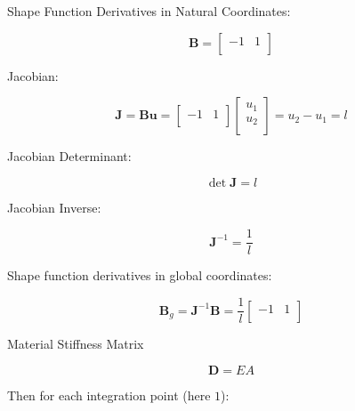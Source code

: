 \documentclass[10pt,b5paper,titlepage]{book}
\newcommand{\m}{\mathbf}
\begin{document}
Shape Function Derivatives in Natural Coordinates:

\begin{equation}
    \m{B} = \begin{bmatrix}
        -1 & 1 \\
    \end{bmatrix}
\end{equation}

Jacobian:

\begin{equation}
    \m{J} = \m{B} \m{u} = \begin{bmatrix}
        -1 & 1 \\
    \end{bmatrix}
    \begin{bmatrix}
        u_1 \\
        u_2 \\
    \end{bmatrix}
    = u_2 - u_1 = l
\end{equation}

Jacobian Determinant:

\begin{equation}
    \det \m{J} = l
\end{equation}

Jacobian Inverse:

\begin{equation}
    \m{J}^{-1} = \frac{1}{l}
\end{equation}

Shape function derivatives in global coordinates:

\begin{equation}
    \m{B}_g = \m{J}^{-1} \m{B} = \frac{1}{l}
    \begin{bmatrix}
        -1 & 1 \\
    \end{bmatrix}
\end{equation}

Material Stiffness Matrix

\begin{equation}
    \m{D} = EA
\end{equation}

Then for each integration point (here $1$):
\end{document}
